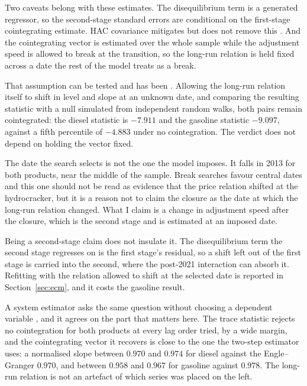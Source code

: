 \documentclass[11pt,a4paper]{article}
\begin{document}
Two caveats belong with these estimates. The disequilibrium term is a generated regressor, so the
second-stage standard errors are conditional on the first-stage cointegrating estimate. HAC
covariance \citep{newey1987simple, andrews1991heteroskedasticity} mitigates but does not remove
this \citep{pagan1984econometric}. And the cointegrating vector is estimated over
the whole sample while the adjustment speed is allowed to break at the transition, so the
long-run relation is held fixed across a date the rest of the model treats as a break.

That assumption can be tested and has been \citep{gregory1996residual}. Allowing the long-run
relation itself to shift in level and slope at an unknown date, and comparing the resulting
statistic with a null simulated from independent random walks, both pairs remain cointegrated:
the diesel statistic is $-7.911$ and the gasoline statistic $-9.097$, against a fifth percentile
of $-4.883$ under no cointegration. The verdict does not depend on holding the vector fixed.

The date the search selects is not the one the model imposes. It falls in 2013 for both
products, near the middle of the sample. Break searches favour central dates and this one should
not be read as evidence that the price relation shifted at the hydrocracker, but it is a reason
not to claim the closure as the date at which the long-run relation changed. What I claim is a
change in adjustment speed after the closure, which is the second stage and is estimated at an
imposed date.

Being a second-stage claim does not insulate it. The disequilibrium term the second stage
regresses on is the first stage's residual, so a shift left out of the first stage is carried
into the second, where the post-2021 interaction can absorb it. Refitting with the relation
allowed to shift at the selected date is reported in Section~\ref{sec:ecm}, and it costs the
gasoline result.

A system estimator asks the same question without choosing a dependent variable
\citep{johansen1988statistical, johansen1991estimation}, and it agrees on the part that matters
here. The trace statistic rejects no cointegration for both products at every lag order tried,
by a wide margin, and the cointegrating vector it recovers is close to the one the two-step
estimator uses: a normalised slope between $0.970$ and $0.974$ for diesel against the
Engle--Granger $0.970$, and between $0.958$ and $0.967$ for gasoline against $0.978$. The
long-run relation is not an artefact of which series was placed on the left.
\end{document}
